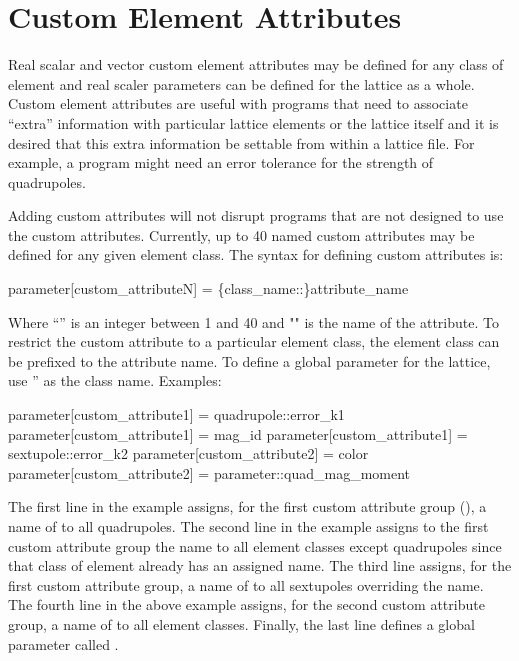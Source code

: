 {{{{{%
\section{Custom Element Attributes}
\label{s:cust.att}

Real scalar and vector custom element attributes may be defined for any class of element and real
scaler parameters can be defined for the lattice as a whole.  Custom element attributes are useful
with programs that need to associate ``extra'' information with particular lattice elements or the
lattice itself and it is desired that this extra information be settable from within a lattice
file. For example, a program might need an error tolerance for the strength of quadrupoles.

Adding custom attributes will not disrupt programs that are not designed to use the custom
attributes. Currently, up to 40 named custom attributes may be defined for any given element
class. The syntax for defining custom attributes is:
\begin{example}
  parameter[custom_attributeN] = \{class_name::\}attribute_name
\end{example}
Where ``'' is an integer between 1 and 40 and "" is the name of the
attribute. To restrict the custom attribute to a particular element class, the element class can be
prefixed to the attribute name. To define a global parameter for the lattice, use ''
as the class name.
Examples:
\begin{example}
  parameter[custom_attribute1] = quadrupole::error_k1
  parameter[custom_attribute1] = mag_id
  parameter[custom_attribute1] = sextupole::error_k2
  parameter[custom_attribute2] = color
  parameter[custom_attribute2] = parameter::quad_mag_moment
\end{example}
The first line in the example assigns, for the first custom attribute group
(), a name of  to all quadrupoles. The second line in the example
assigns to the first custom attribute group the name  to all element classes except
quadrupoles since that class of element already has an assigned name. The third line assigns, for
the first custom attribute group, a name of  to all sextupoles overriding the
 name. The fourth line in the above example assigns, for the second custom attribute
group, a name of  to all element classes. Finally, the last line defines a global parameter
called .

}}}}}
